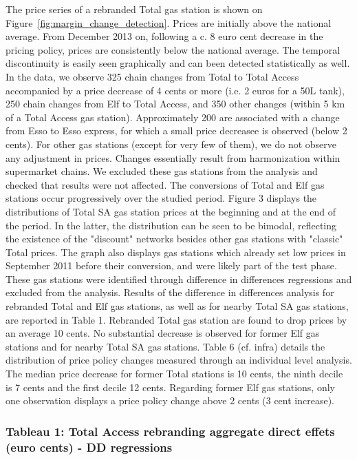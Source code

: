 \documentclass[english]{article}
\begin{document}
The price series of a rebranded Total gas station is shown on Figure~\ref{fig:margin_change_detection}. Prices are initially above the national average. From December 2013 on, 
following a c. 8 euro cent decrease in the pricing policy, prices are consistently below the national average. The temporal discontinuity is easily seen graphically and can been detected statistically as well. In the data, we observe 325 chain changes from Total to Total Access accompanied by a price decrease of 4 cents or more (i.e. 2 euros for a 50L tank), 250 chain changes from Elf to Total Access, and 350 other changes (within 5 km of a Total Access gas station). Approximately 200  are associated with a change from Esso to Esso express, for which a small price decreasee is observed (below 2 cents). For other gas 
stations (except for very few of them), we do not observe any adjustment in prices. Changes essentially result from harmonization within supermarket chains. We excluded these gas stations from the analysis and checked that results were not affected. The conversions of Total and Elf gas stations occur progressively over the studied period. Figure 3 displays the distributions of Total SA gas station prices at the beginning and at the end of the period. In the latter, the distribution can be seen to be bimodal, reflecting the existence of the "discount" networks besides other gas stations with "classic" Total prices. The graph also displays gas stations which already set low prices in September 2011 before their conversion, and were likely part of the test phase. These gas stations were identified through difference in differences regressions and excluded from the analysis. Results of the difference in differences analysis for rebranded Total 
and Elf gas stations, as well as for nearby Total SA gas stations, are reported in Table 1. Rebranded Total gas station are found to drop prices by an average 10 cents. No substantial decrease is observed for former Elf gas stations and for nearby Total SA gas 
stations. Table 6 (cf. infra) details the distribution of price policy changes measured through an individual level analysis. The median price decrease for former Total stations is 10 cents, the ninth decile is 7 cents and the first decile 12 cents. Regarding former Elf gas stations, only one observation displays a price policy change above 2 cents (3 cent increase).

\subsubsection*{Tableau 1: Total Access rebranding aggregate direct effets (euro cents) - DD regressions}
\end{document}
